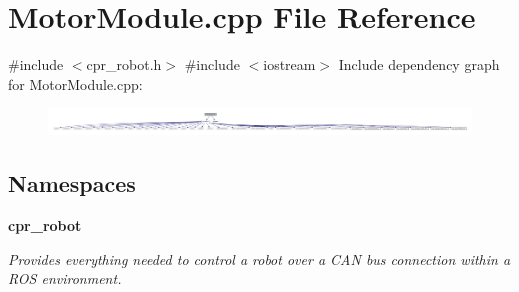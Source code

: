 \section{Motor\+Module.\+cpp File Reference}
\label{MotorModule_8cpp}
{\ttfamily \#include $<$cpr\+\_\+robot.\+h$>$}\newline
{\ttfamily \#include $<$iostream$>$}\newline
Include dependency graph for Motor\+Module.\+cpp\+:
\nopagebreak
\begin{figure}[H]
\begin{center}
\leavevmode
\includegraphics[width=350pt]{MotorModule_8cpp__incl}
\end{center}
\end{figure}
\subsection*{Namespaces}
\begin{DoxyCompactItemize}
\item 
 \textbf{ cpr\+\_\+robot}
\begin{DoxyCompactList}\small\item\em Provides everything needed to control a robot over a C\+AN bus connection within a R\+OS environment. \end{DoxyCompactList}\end{DoxyCompactItemize}

